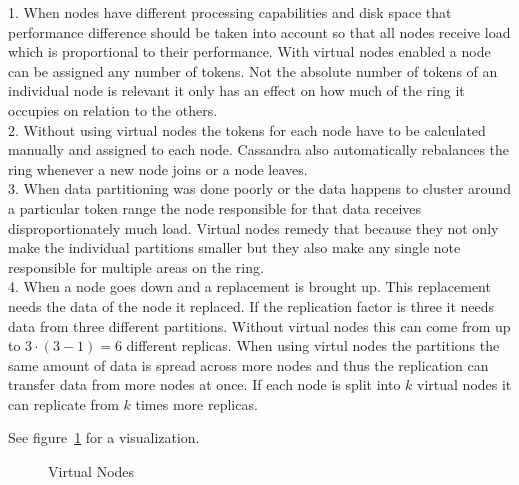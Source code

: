 1. When nodes have different processing capabilities and disk space that performance difference should be taken into account so that all nodes receive load which is proportional to their performance. With virtual nodes enabled a node can be assigned any number of tokens. Not the absolute number of tokens of an individual node is relevant it only has an effect on how much of the ring it occupies on relation to the others.  \\
2. Without using virtual nodes the tokens for each node have to be calculated manually and assigned to each node. Cassandra also automatically rebalances the ring whenever a new node joins or a node leaves. \\
3. When data partitioning was done poorly or the data happens to cluster around a particular token range the node responsible for that data receives disproportionately much load. Virtual nodes remedy that because they not only make the individual partitions smaller but they also make any single note responsible for multiple areas on the ring. \\
4. When a node goes down and a replacement is brought up. This replacement needs the data of the node it replaced. If the replication factor is three it needs data from three different partitions. Without virtual nodes this can come from up to $3\cdot(3-1)=6$ different replicas. When using virtul nodes the partitions the same amount of data is spread across more nodes and thus the replication can transfer data from more nodes at once. If each node is split into $k$ virtual nodes it can replicate from $k$ times more replicas.

See figure~\ref{fig:cassandra:vnodes} for a visualization.

\begin{figure}[ht]
  \centering
  \caption{Virtual Nodes}
  \label{fig:cassandra:vnodes}
\end{figure}

